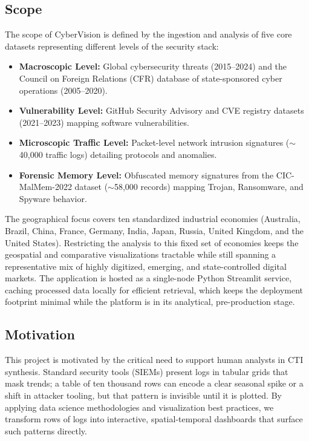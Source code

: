 \documentclass[a4paper, 12pt]{report}
\begin{document}
\subsection{Scope}
The scope of CyberVision is defined by the ingestion and analysis of five core datasets representing different levels of the security stack:
\begin{itemize}
    \item \textbf{Macroscopic Level:} Global cybersecurity threats (2015--2024) and the Council on Foreign Relations (CFR) database of state-sponsored cyber operations (2005--2020).
    \item \textbf{Vulnerability Level:} GitHub Security Advisory and CVE registry datasets (2021--2023) mapping software vulnerabilities.
    \item \textbf{Microscopic Traffic Level:} Packet-level network intrusion signatures ($\sim$40,000 traffic logs) detailing protocols and anomalies.
    \item \textbf{Forensic Memory Level:} Obfuscated memory signatures from the CIC-MalMem-2022 dataset ($\sim$58,000 records) mapping Trojan, Ransomware, and Spyware behavior.
\end{itemize}
The geographical focus covers ten standardized industrial economies (Australia, Brazil, China, France, Germany, India, Japan, Russia, United Kingdom, and the United States). Restricting the analysis to this fixed set of economies keeps the geospatial and comparative visualizations tractable while still spanning a representative mix of highly digitized, emerging, and state-controlled digital markets. The application is hosted as a single-node Python Streamlit service, caching processed data locally for efficient retrieval, which keeps the deployment footprint minimal while the platform is in its analytical, pre-production stage.

\subsection{Motivation}
This project is motivated by the critical need to support human analysts in CTI synthesis. Standard security tools (SIEMs) present logs in tabular grids that mask trends; a table of ten thousand rows can encode a clear seasonal spike or a shift in attacker tooling, but that pattern is invisible until it is plotted. By applying data science methodologies and visualization best practices, we transform rows of logs into interactive, spatial-temporal dashboards that surface such patterns directly.
\end{document}
